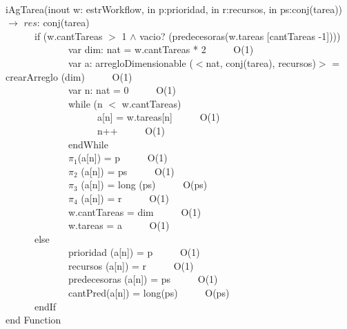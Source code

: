 \documentclass[a4paper,10pt]{article}
\begin{document}
\begin{algoritmo}
\caption{}\\
  iAgTarea(inout w: estrWorkflow, in p:prioridad, in r:recursos, in ps:conj(tarea)) $\rightarrow$ $res$: conj(tarea)\\
    \indent \ \ \ \ \ \  if (w.cantTareas $>$ 1 $\wedge$ vacio? (predecesoras(w.tareas [cantTareas -1])))\\
    \indent \ \ \ \ \ \ \ \ \ \ \ \ \ var dim: nat = w.cantTareas * 2 \ \ \ \ \ O(1) \\
    \indent \ \ \ \ \ \ \ \ \ \ \ \ \ var a: arregloDimensionable ($<$nat, conj(tarea), recursos)$>$ = crearArreglo (dim)  \ \ \ \ \ O(1) \\
    \indent \ \ \ \ \ \ \ \ \ \ \ \ \ var n: nat = 0 \ \ \ \ \ O(1) \\
    \indent \ \ \ \ \ \ \ \ \ \ \ \ \ while (n $<$ w.cantTareas) \\
    \indent \ \ \ \ \ \ \ \ \ \ \ \ \ \ \ \ \ \ \ a[n] = w.tareas[n] \ \ \ \ \ O(1) \\
    \indent \ \ \ \ \ \ \ \ \ \ \ \ \ \ \ \ \ \ \ n++ \ \ \ \ \ O(1) \\
    \indent \ \ \ \ \ \ \ \ \ \ \ \ \ endWhile \\
    \indent \ \ \ \ \ \ \ \ \ \ \ \ \ $\pi_1$(a[n]) = p \ \ \ \ \ O(1) \\
    \indent \ \ \ \ \ \ \ \ \ \ \ \ \ $\pi_2$ (a[n]) = ps \ \ \ \ \ O(1) \\
    \indent \ \ \ \ \ \ \ \ \ \ \ \ \ $\pi_3$ (a[n]) = long (ps) \ \ \ \ \ O(ps) \\
    \indent \ \ \ \ \ \ \ \ \ \ \ \ \ $\pi_4$ (a[n]) = r \ \ \ \ \ O(1) \\
    \indent \ \ \ \ \ \ \ \ \ \ \ \ \ w.cantTareas = dim \ \ \ \ \ O(1) \\
    \indent \ \ \ \ \ \ \ \ \ \ \ \ \ w.tareas = a \ \ \ \ \ O(1) \\
    \indent \ \ \ \ \ \ else \\
    \indent \ \ \ \ \ \ \ \ \ \ \ \ \ prioridad (a[n]) = p \ \ \ \ \ O(1) \\
    \indent \ \ \ \ \ \ \ \ \ \ \ \ \ recursos (a[n]) = r \ \ \ \ \ O(1) \\
    \indent \ \ \ \ \ \ \ \ \ \ \ \ \ predecesoras (a[n]) = ps \ \ \ \ \ O(1) \\
    \indent \ \ \ \ \ \ \ \ \ \ \ \ \ cantPred(a[n]) = long(ps) \ \ \ \ \ O(ps)\\
    \indent \ \ \ \ \ \ endIf \\
   end Function \\
   

\end{algoritmo}
\end{document}
